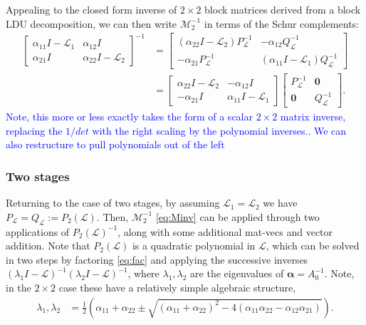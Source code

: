\documentclass[a4paper,10pt]{article}
\newcommand{\tcb}{\textcolor{blue}}
\begin{document}
Appealing to the closed form inverse of $2\times 2$ block matrices derived from a block LDU decomposition,
we can then write $\mathcal{M}_2^{-1}$ in terms of the Schur complements:
%
\begin{align}
\begin{bmatrix} \alpha_{11} I - \mathcal{L}_1 & \alpha_{12}I \\ \alpha_{21}I & \alpha_{22}I - \mathcal{L}_2\end{bmatrix} ^{-1}
	& = \begin{bmatrix}  (\alpha_{22} I - \mathcal{L}_2 )P_{\mathcal{L}}^{-1} & -\alpha_{12}Q_{\mathcal{L}}^{-1} \\
		-\alpha_{21}P_{\mathcal{L}}^{-1} & (\alpha_{11} I - \mathcal{L}_1 )Q_{\mathcal{L}}^{-1} \end{bmatrix} \nonumber\\
& = \begin{bmatrix} \alpha_{22} I - \mathcal{L}_2  & -\alpha_{12}I \\ -\alpha_{21}I & \alpha_{11} I - \mathcal{L}_1 \end{bmatrix} 
	\begin{bmatrix} P_{\mathcal{L}}^{-1}  & \mathbf{0} \\ \mathbf{0} & Q_{\mathcal{L}}^{-1} \end{bmatrix}.\label{eq:Minv}
\end{align}
%
\tcb{Note, this more or less exactly takes the form of a scalar $2\times 2$ matrix inverse, replacing
the $1/det$ with the right scaling by the polynomial inverses.. We can also restructure to pull
polynomials out of the left }


\subsubsection{Two stages}

Returning to the case of two stages, by assuming $\mathcal{L}_1 = \mathcal{L}_2$ we have
$P_{\mathcal{L}} = Q_{\mathcal{L}} := P_2(\mathcal{L})$. Then, $\mathcal{M}_2^{-1}$ \eqref{eq:Minv} can
be applied through two applications of $P_2(\mathcal{L})^{-1}$, along with some additional mat-vecs and
vector addition. Note that $P_2(\mathcal{L})$ is a quadratic polynomial in $\mathcal{L}$, which can be
solved in two steps by factoring \eqref{eq:fac} and applying the successive inverses
$(\lambda_1 I - \mathcal{L})^{-1}(\lambda_2 I - \mathcal{L})^{-1}$, where $\lambda_1,\lambda_2$ are
the eigenvalues of $\boldsymbol{\alpha} = A_0^{-1}$. Note, in the $2\times 2$ case these have a
relatively simple algebraic structure, 
%
\begin{align*}
\lambda_1,\lambda_2 & = \frac{1}{2} \left( \alpha_{11} + \alpha_{22} \pm \sqrt{ (\alpha_{11} + \alpha_{22})^2 - 4 ( \alpha_{11}\alpha_{22} - \alpha_{12}\alpha_{21})} \right).
\end{align*}
%
\end{document}
